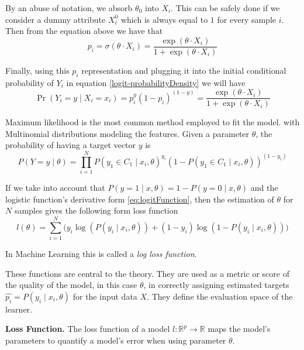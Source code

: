 By an abuse of notation, we absorb $\theta_0$ into $X_i$.
This can be safely done if we consider a dummy attribute $X_i^0$ which is always equal to $1$ for every sample $i$.
Then from the equation above we have that
\begin{equation}
p_i = \sigma(\theta \cdot X_i) = \frac{\exp(\theta \cdot X_i) }{1 + \exp(\theta \cdot X_i)}
\end{equation}

Finally, using this $p_i$ representation and plugging it into the initial conditional probability of $Y_i$ in equation \cref{logit-probabilityDensity} we will have
\begin{equation}
 \Pr(Y_i=y \mid X_i = x_i) = p_i^{y} {(1-p_i)}^{(1-y)} = \frac{\exp(\theta \cdot X_i) }{1 + \exp(\theta \cdot X_i)}
 \end{equation}


Maximum likelihood is the most common method employed to fit the model.
with Multinomial distributions modeling the features.
Given a parameter $\theta$, the probability of having a target vector $y$ is
\begin{equation}
P(Y =y \mid \theta ) = \prod_{i=1}^N {P(y_1 \in C_1 \mid x_i, \theta)}^{y_i} {(1 - P(y_1 \in C_1 \mid x_i, \theta) )}^{(1-y_i)}
\end{equation}

If we take into account that $P(y=1 \mid x,\theta) = 1 - P(y=0 \mid x,\theta)$ and the logistic function's derivative form \cref{eq:logitFunction}, then the estimation of $\theta$ for $N$ samples gives the following form
loss function
\begin{equation}
l(\theta) = \sum_{i=1}^N \big(y_i \log(P(y_i \mid x_i,\theta)) + (1-y_i)\log(1 - P(y_i \mid x_i,\theta) ) \big)
\label{eq:logLossFunction}
\end{equation}

In Machine Learning this is called a \emph{log loss function}.

These functions are central to the theory.
They are used as a metric or score of the quality of the model, in this case $\theta$, in correctly assigning estimated targets $ {\hat{p_i}} = P(y_i \mid x_i,\theta)$ for the input data $X$.
They define the evaluation space of the learner.

\begin{definition}{\textbf{Loss Function.}}
The loss function of a model $l: \mathbb{R}^{ p} \rightarrow  \mathbb{R} $ maps the model's parameters to quantify a model's error when using parameter $\theta$.
\end{definition}

